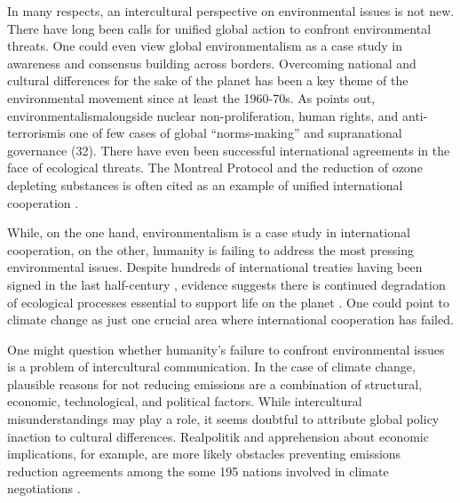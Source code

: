 In many respects, an intercultural perspective on environmental issues is not new. There have long been calls for unified global action to confront environmental threats. One could even view global environmentalism as a case study in awareness and consensus building across borders. Overcoming national and cultural differences for the sake of the planet has been a key theme of the environmental movement since at least the 1960-70s. As \cite*{Jasanoff2004a} points out, environmentalism\textemdash alongside nuclear non-proliferation, human rights, and anti-terrorism\textemdash is one of few cases of global ``norms-making'' and supranational governance (32). There have even been successful international agreements in the face of ecological threats. The Montreal Protocol and the reduction of ozone depleting substances is often cited as an example of unified international cooperation \citep{EuropeanCommission2007a}.

While, on the one hand, environmentalism is a case study in international cooperation, on the other, humanity is failing to address the most pressing environmental issues. Despite hundreds of international treaties having been signed in the last half-century \citep{Mitchella}, evidence suggests there is continued degradation of ecological processes essential to support life on the planet \citep{Steffen2015c, Steffen2015b}. One could point to climate change as just one crucial area where international cooperation has failed. 

One might question whether humanity's failure to confront environmental issues is a problem of intercultural communication. In the case of climate change, plausible reasons for not reducing emissions are a combination of structural, economic, technological, and political factors. While intercultural misunderstandings may play a role, it seems doubtful to attribute global policy inaction to cultural differences. Realpolitik and apprehension about economic implications, for example, are more likely obstacles preventing emissions reduction agreements among the some 195 nations involved in climate negotiations \citep{Stern2018a}. 

